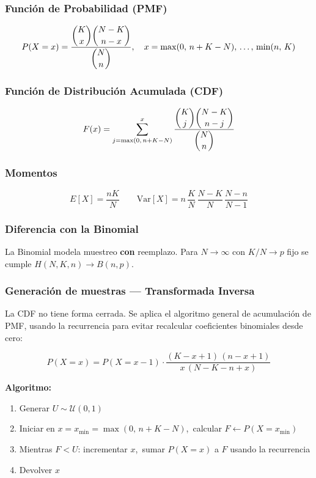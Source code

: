 \subsubsection{Función de Probabilidad (PMF)}

\begin{equation}
P(X = x) = \frac{\dbinom{K}{x}\dbinom{N-K}{n-x}}{\dbinom{N}{n}},
\quad x = \max(0,\,n+K-N),\, \ldots,\, \min(n,\,K)
\end{equation}

\subsubsection{Función de Distribución Acumulada (CDF)}

\begin{equation}
F(x) = \sum_{j=\max(0,\,n+K-N)}^{x}
\frac{\dbinom{K}{j}\dbinom{N-K}{n-j}}{\dbinom{N}{n}}
\end{equation}

\subsubsection{Momentos}

\begin{equation}
E[X] = \frac{nK}{N} \qquad
\text{Var}[X] = n\,\frac{K}{N}\,\frac{N-K}{N}\,\frac{N-n}{N-1}
\end{equation}

\subsubsection{Diferencia con la Binomial}

La Binomial modela muestreo \textbf{con} reemplazo. Para $N \to \infty$ con $K/N \to p$
fijo se cumple $H(N,K,n) \to B(n,p)$.

\subsubsection{Generación de muestras — Transformada Inversa}

La CDF no tiene forma cerrada. Se aplica el algoritmo general de acumulación de PMF,
usando la recurrencia para evitar recalcular coeficientes binomiales desde cero:

\begin{equation}
P(X = x) = P(X = x-1) \cdot
\frac{(K - x + 1)\,(n - x + 1)}{x\,(N - K - n + x)}
\end{equation}

\textbf{Algoritmo:}
\begin{enumerate}
    \item Generar $U \sim \mathcal{U}(0,1)$
    \item Iniciar en $x = x_{\min} = \max(0,\, n+K-N)$,\ calcular $F \leftarrow P(X = x_{\min})$
    \item Mientras $F < U$: incrementar $x$,\ sumar $P(X=x)$ a $F$ usando la recurrencia
    \item Devolver $x$
\end{enumerate}

